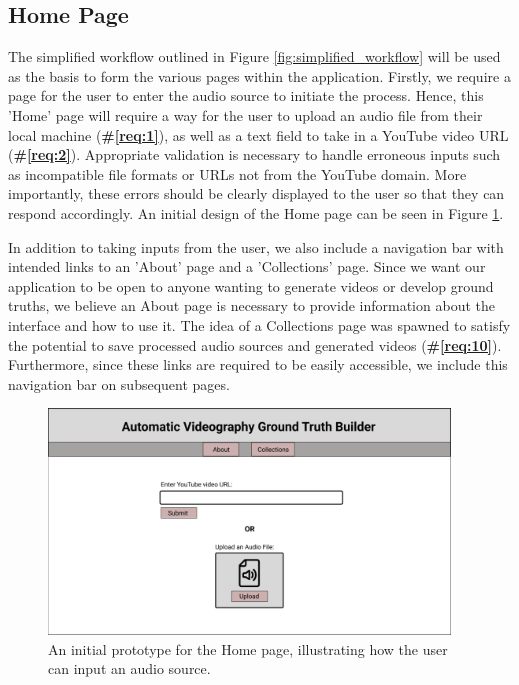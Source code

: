 \documentclass{l4proj}
\begin{document}
\subsection{Home Page}
The simplified workflow outlined in Figure \ref{fig:simplified_workflow} will be used as the basis to form the various pages within the application. Firstly, we require a page for the user to enter the audio source to initiate the process. Hence, this 'Home' page will require a way for the user to upload an audio file from their local machine (\textbf{\#\ref{req:1}}), as well as a text field to take in a YouTube video URL (\textbf{\#\ref{req:2}}). Appropriate validation is necessary to handle erroneous inputs such as incompatible file formats or URLs not from the YouTube domain. More importantly, these errors should be clearly displayed to the user so that they can respond accordingly. An initial design of the Home page can be seen in Figure \ref{fig:home_page}. 

In addition to taking inputs from the user, we also include a navigation bar with intended links to an 'About' page and a 'Collections' page. Since we want our application to be open to anyone wanting to generate videos or develop ground truths, we believe an About page is necessary to provide information about the interface and how to use it. The idea of a Collections page was spawned to satisfy the potential to save processed audio sources and generated videos (\textbf{\#\ref{req:10}}). Furthermore, since these links are required to be easily accessible, we include this navigation bar on subsequent pages.

\begin{figure}
    \centering
    \includegraphics[width=0.95\textwidth]{figures/home_page.pdf}
    \caption{An initial prototype for the Home page, illustrating how the user can input an audio source.}
    \label{fig:home_page}
\end{figure}
\end{document}
